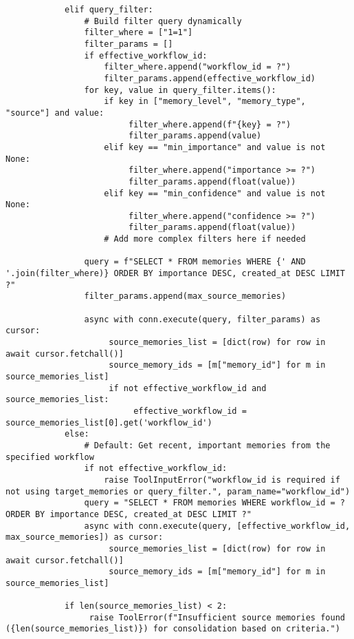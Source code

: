 \documentclass[12pt,a4paper]{article}
\begin{document}
\begin{pageablecode}
\begin{verbatim}
            elif query_filter:
                # Build filter query dynamically
                filter_where = ["1=1"]
                filter_params = []
                if effective_workflow_id:
                    filter_where.append("workflow_id = ?")
                    filter_params.append(effective_workflow_id)
                for key, value in query_filter.items():
                    if key in ["memory_level", "memory_type", "source"] and value:
                         filter_where.append(f"{key} = ?")
                         filter_params.append(value)
                    elif key == "min_importance" and value is not None:
                         filter_where.append("importance >= ?")
                         filter_params.append(float(value))
                    elif key == "min_confidence" and value is not None:
                         filter_where.append("confidence >= ?")
                         filter_params.append(float(value))
                    # Add more complex filters here if needed

                query = f"SELECT * FROM memories WHERE {' AND '.join(filter_where)} ORDER BY importance DESC, created_at DESC LIMIT ?"
                filter_params.append(max_source_memories)

                async with conn.execute(query, filter_params) as cursor:
                     source_memories_list = [dict(row) for row in await cursor.fetchall()]
                     source_memory_ids = [m["memory_id"] for m in source_memories_list]
                     if not effective_workflow_id and source_memories_list:
                          effective_workflow_id = source_memories_list[0].get('workflow_id')
            else:
                # Default: Get recent, important memories from the specified workflow
                if not effective_workflow_id:
                    raise ToolInputError("workflow_id is required if not using target_memories or query_filter.", param_name="workflow_id")
                query = "SELECT * FROM memories WHERE workflow_id = ? ORDER BY importance DESC, created_at DESC LIMIT ?"
                async with conn.execute(query, [effective_workflow_id, max_source_memories]) as cursor:
                     source_memories_list = [dict(row) for row in await cursor.fetchall()]
                     source_memory_ids = [m["memory_id"] for m in source_memories_list]

            if len(source_memories_list) < 2:
                 raise ToolError(f"Insufficient source memories found ({len(source_memories_list)}) for consolidation based on criteria.")


\end{verbatim}
\end{pageablecode}
\end{document}
